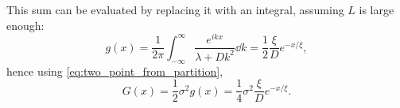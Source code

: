  This sum can be evaluated by replacing it with an integral, assuming $L$ is large enough:
 \begin{equation}
   \label{eq:G_as_integral}
   g(x) = \frac{1}{2\pi}\int_{-\infty}^{\infty}  \frac{e^{ikx}}{\lambda + Dk^2} \dd{k} = \frac{1}{2} \frac{\xi}{D} e^{-x/\xi},
 \end{equation}
 hence using \cref{eq:two_point_from_partition},
 \begin{equation}
   \label{eq:G_from_G}
   G(x) = \frac{1}{2}\sigma^2g(x) =  \frac{1}{4} \sigma^2 \frac{\xi}{D} e^{-x/\xi}.
 \end{equation}